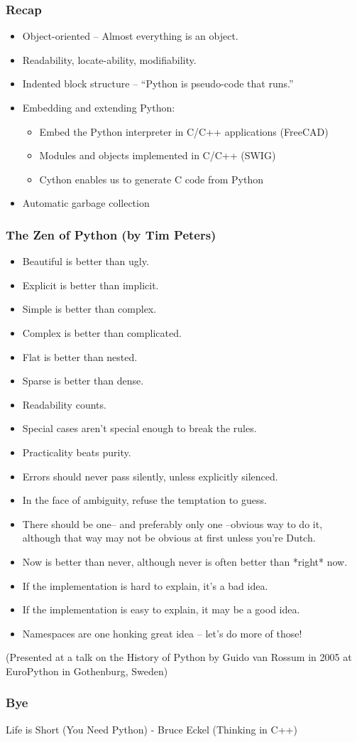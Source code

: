 \begin{frame}\frametitle{Recap}

\begin{itemize}
\item Object-oriented -- Almost everything is an object.
\item Readability, locate-ability, modifiability.
\item Indented block structure -- ``Python is pseudo-code that runs.''
\item Embedding and extending Python:
\begin{itemize}
\item  Embed the Python interpreter in C/C++ applications (FreeCAD)
\item  Modules and objects implemented in C/C++ (SWIG)
\item Cython enables us to generate C code from Python
\end{itemize}
\item Automatic garbage collection
\end{itemize}
\end{frame}


\begin{frame}\frametitle{The Zen of Python (by Tim Peters)}
\scriptsize
\begin{itemize}
\item Beautiful is better than ugly.
\item Explicit is better than implicit.
\item Simple is better than complex.
\item Complex is better than complicated.
\item Flat is better than nested.
\item Sparse is better than dense.
\item Readability counts.
\item Special cases aren't special enough to break the rules.
\item Practicality beats purity.
\item Errors should never pass silently, unless explicitly silenced.
\item In the face of ambiguity, refuse the temptation to guess.
\item There should be one-- and preferably only one --obvious way to do it, although that way may not be obvious at first unless you're Dutch.
\item Now is better than never, although never is often better than *right* now.
\item If the implementation is hard to explain, it's a bad idea.
\item If the implementation is easy to explain, it may be a good idea.
\item Namespaces are one honking great idea -- let's do more of those!
\end{itemize}
(Presented at a talk on the History of Python by Guido van Rossum in 2005 at EuroPython in Gothenburg, Sweden)
\end{frame}

\begin{frame}\frametitle{Bye}
{\large Life is Short}
(You Need Python)
- Bruce Eckel (Thinking in C++)
\end{frame}




